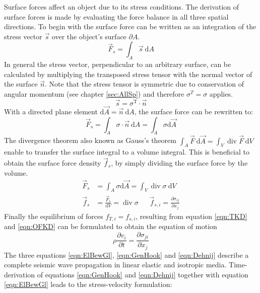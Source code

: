 \documentclass[pdftex,a4paper,parskip,listof=totoc,bibliography=totoc,onehalfspacing,12pt]{scrreprt}
\begin{document}
Surface forces affect an object due to its stress conditions. The derivation of surface forces is made by evaluating the force balance in all three spatial directions. To begin with the surface force can be written as an integration of the stress vector $\vec{s}$ over the object's surface $\partial A$.
\begin{equation}
	\vec{F}_s = \int_A \vec{s} ~\mathrm{d}A
\end{equation}
In general the stress vector, perpendicular to an arbitrary surface, can be calculated by multiplying the transposed stress tensor with the normal vector of the surface $\vec{n}$. Note that the stress tensor is symmetric due to conservation of angular momentum (see chapter \ref{sec:AllSp}) and therefore $\sigma^T = \sigma$ applies.
\begin{equation}
	\vec{s} = \sigma^\mathrm{T} \cdot\vec{n}
\end{equation}
With a directed plane element $\mathrm{d}\vec{A} = \vec{n} ~\mathrm{d}A$, the surface force can be rewritten to: 
\begin{equation}
	\vec{F}_s = \int_A \sigma \cdot\vec{n} ~\mathrm{d}A = \int_A \sigma \mathrm{d}\vec{A} 
\end{equation}
The divergence theorem also known as Gauss's theorem $\int_A \vec{F}~\mathrm{d}\vec{A} = \int_V \operatorname{div} \vec{F} ~\mathrm{d}V$ enable to transfer the surface integral to a volume integral. This is beneficial to obtain the surface force density $\vec{f}_{s}$, by simply dividing the surface force by the volume. 
\begin{align}
	\vec{F}_s &= \int_A \sigma \mathrm{d}\vec{A} = \int_V \operatorname{div} \sigma ~\mathrm{d}V\\
	\vec{f}_s &= \frac{\vec{F}_s}{\mathrm{d}V} = \operatorname{div} \sigma~~~~~~~\vec{f}_{s,i} = \frac{\partial \sigma_{ij}}{\partial x_j}\label{eqn:OFKD}
\end{align}
Finally the equilibrium of forces $f_{T,i} = f_{s,i}$, resulting from equation \ref{eqn:TKD} and \ref{eqn:OFKD} can be formulated to obtain the equation of motion 
\begin{equation}
	\rho \frac{\partial v_i}{\partial t} =  \frac{\partial \sigma_{ji}}{\partial x_j}\label{eqn:ElBewGl}
\end{equation}
The three equations \ref{eqn:ElBewGl}, \ref{eqn:GenHook} and \ref{eqn:Dehnij} describe a complete seismic wave propagation in linear elastic and isotropic media. Time-derivation of equations \ref{eqn:GenHook} and \ref{eqn:Dehnij} together with equation \ref{eqn:ElBewGl} leads to the stress-velocity formulation:
\end{document}
